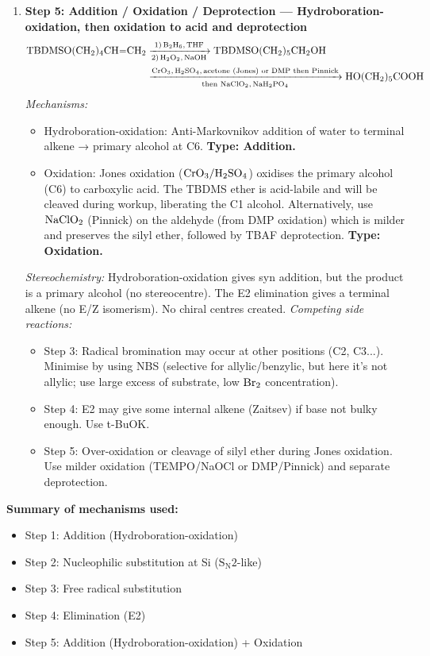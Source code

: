 \documentclass[11pt]{article}
\begin{document}
\begin{corrige}
\begin{enumerate}
\begin{enumerate}
\item \textbf{Step 5: Addition / Oxidation / Deprotection — Hydroboration-oxidation, then oxidation to acid and deprotection}
   \begin{align*}
   \ce{TBDMSO(CH2)4CH=CH2 &->[1) B2H6, THF][2) H2O2, NaOH] TBDMSO(CH2)5CH2OH} \\
   &\xrightarrow[\text{then } \ce{NaClO2, NaH2PO4}]{\ce{CrO3, H2SO4, acetone} \text{ (Jones) or } \ce{DMP} \text{ then Pinnick}} \ce{HO(CH2)5COOH}
   \end{align*}
   \textit{Mechanisms:} 
   \begin{itemize}
   \item Hydroboration-oxidation: Anti-Markovnikov addition of water to terminal alkene → primary alcohol at C6. \textbf{Type: Addition.}
   \item Oxidation: Jones oxidation (\(\ce{CrO3}/\ce{H2SO4}\)) oxidises the primary alcohol (C6) to carboxylic acid. The TBDMS ether is acid-labile and will be cleaved during workup, liberating the C1 alcohol. Alternatively, use \(\ce{NaClO2}\) (Pinnick) on the aldehyde (from DMP oxidation) which is milder and preserves the silyl ether, followed by TBAF deprotection. \textbf{Type: Oxidation.}
   \end{itemize}
   \textit{Stereochemistry:} Hydroboration-oxidation gives syn addition, but the product is a primary alcohol (no stereocentre). The E2 elimination gives a terminal alkene (no E/Z isomerism). No chiral centres created.
   \textit{Competing side reactions:} 
   \begin{itemize}
   \item Step 3: Radical bromination may occur at other positions (C2, C3...). Minimise by using NBS (selective for allylic/benzylic, but here it's not allylic; use large excess of substrate, low \(\ce{Br2}\) concentration).
   \item Step 4: E2 may give some internal alkene (Zaitsev) if base not bulky enough. Use t-BuOK.
   \item Step 5: Over-oxidation or cleavage of silyl ether during Jones oxidation. Use milder oxidation (TEMPO/NaOCl or DMP/Pinnick) and separate deprotection.
   \end{itemize}
\end{enumerate}

\textbf{Summary of mechanisms used:}
\begin{itemize}
\item Step 1: Addition (Hydroboration-oxidation)
\item Step 2: Nucleophilic substitution at Si (\(\mathrm{S_N2}\)-like)
\item Step 3: Free radical substitution
\item Step 4: Elimination (E2)
\item Step 5: Addition (Hydroboration-oxidation) + Oxidation
\end{itemize}


\end{enumerate}
\end{corrige}
\end{document}
